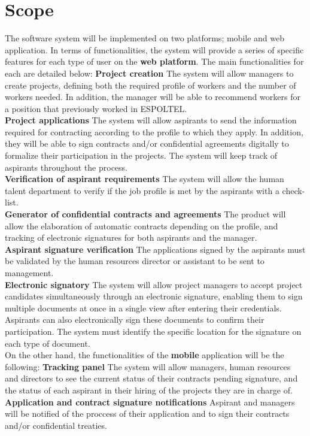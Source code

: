 \documentclass{scrreprt}
\begin{document}
\section{Scope}
The software system will be implemented on two platforms; mobile and web application. In terms of functionalities, the system will provide a series of specific features for each type of user on the \textbf{web platform}. The main functionalities for each are detailed below:
\textbf{Project creation}
The system will allow managers to create projects, defining both the required profile of workers and the number of workers needed. In addition, the manager will be able to recommend workers for a position that previously worked in ESPOLTEL.\\
\textbf{Project applications}
The system will allow aspirants to send the information required for contracting according to the profile to which they apply. In addition, they will be able to sign contracts and/or confidential agreements digitally to formalize their participation in the projects. The system will keep track of aspirants throughout the process.\\
\textbf{Verification of aspirant requirements}
The system will allow the human talent department to verify if the job profile is met by the aspirants with a check-list.\\
\textbf{Generator of confidential contracts and agreements}
The product will allow the elaboration of automatic contracts depending on the profile, and tracking of electronic signatures for both aspirants and the manager.\\
\textbf{Aspirant signature verification} 
The applications signed by the aspirants must be validated by the human resources director or assistant to be sent to management.\\
\textbf{Electronic signatory} 
The system will allow project managers to accept project candidates simultaneously through an electronic signature, enabling them to sign multiple documents at once in a single view after entering their credentials. Aspirants can also electronically sign these documents to confirm their participation.
The system must identify the specific location for the signature on each type of document.
\vspace{2em}\\
 On the other hand, the functionalities of the \textbf{mobile} application will be the following: 
\textbf{Tracking panel}
The system will allow managers, human resources and directors to see the current status of their contracts pending signature, and the status of each aspirant in their hiring of the projects they are in charge of.
\textbf{Application and contract signature notifications} 
Aspirant and managers will be notified of the proccess of their application and to sign their contracts and/or confidential treaties.
\end{document}
